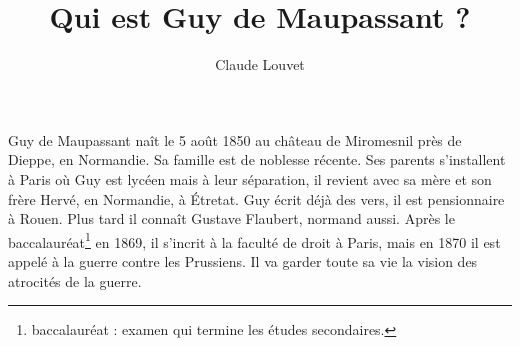 \documentclass[a5paper,notitlepage]{article}
\author{Claude Louvet}
\title{Qui est Guy de Maupassant ?}
\begin{document}
\maketitle

Guy de Maupassant naît le 5 août 1850 au château de Miromesnil près de Dieppe, en Normandie. Sa famille est de
noblesse récente. Ses parents s'installent à Paris où Guy est lycéen mais à leur séparation, il revient avec sa mère
et son frère Hervé, en Normandie, à Étretat. Guy écrit déjà des vers, il est pensionnaire à Rouen. Plus tard il connaît
Gustave Flaubert, normand aussi. Après le baccalauréat\footnote{baccalauréat : examen qui termine les études
secondaires.} en 1869, il s'incrit à la faculté de droit à Paris, mais en 1870 il est appelé à la guerre contre les
Prussiens. Il va garder toute sa vie la vision des atrocités de la guerre.
\end{document}
